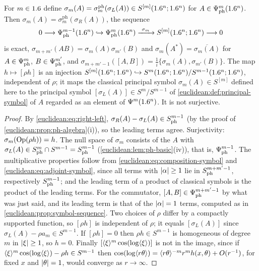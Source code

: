 \begin{proposition}\label{euclidean:prop:ph-symbol}
  For $m\in1.6$ define
  $\sigma_m(A)=\sigma^{\mathrm{ph}}_m(\sigma_L(A))\in S^{[m]}(1.6^n;1.6^n)$ for
  $A\in\Psi^{m}_{\mathrm{ph}}(1.6^n)$. Then $\sigma_m(A)=\sigma^{\mathrm{ph}}_m(\sigma_R(A))$,
  the sequence
  \begin{equation*}
    0\longrightarrow\Psido{m-1}_{\mathrm{ph}}(\R^n)\hookrightarrow
    \Psido m_{\mathrm{ph}}(\R^n)\xrightarrow{\ \sigma_m\ }S^{[m]}(\R^n;\R^n)
    \longrightarrow0
  \end{equation*}
  is exact, $\sigma_{m+m'}(AB)=\sigma_m(A)\sigma_{m'}(B)$ and
  $\sigma_m(A^*)=\overline{\sigma_m(A)}$ for $A\in\Psi^{m}_{\mathrm{ph}}$,
  $B\in\Psi^{m'}_{\mathrm{ph}}$, and $\sigma_{m+m'-1}([A,B])=\frac1i\{\sigma_m(A),\sigma_{m'}(B)\}$.
  The map $h\mapsto[\rho h]$ is an injection
  $S^{[m]}(1.6^n;1.6^n)\hookrightarrow S^m(1.6^n;1.6^n)/S^{m-1}(1.6^n;1.6^n)$, independent
  of $\rho$; it maps the classical principal symbol $\sigma_m(A)\in S^{[m]}$ defined here to
  the principal symbol $[\sigma_L(A)]\in S^m/S^{m-1}$ of
  \cref{euclidean:def:principal-symbol} of $A$ regarded as an element of
  $\Psi^{m}(1.6^n)$. It is not surjective.
\end{proposition}
\begin{proof}
  By \eqref{euclidean:eq:right-left}, $\sigma_R(A)-\sigma_L(A)\in S^{m-1}_{\mathrm{ph}}$ (by the
  proof of \cref{euclidean:prop:ph-algebra}(i)), so the leading terms agree.
  Surjectivity: $\sigma_m(\operatorname{Op}(\rho h))=h$. The null space of $\sigma_m$ consists of
  the $A$ with $\sigma_L(A)\in S^{m}_{\mathrm{ph}}\cap S^{m-1}=S^{m-1}_{\mathrm{ph}}$
  (\cref{euclidean:lem:ph-basic}(iv)), that is, $\Psi^{m-1}_{\mathrm{ph}}$. The
  multiplicative properties follow from \eqref{euclidean:eq:composition-symbol} and
  \eqref{euclidean:eq:adjoint-symbol}, since all terms with $\lvert \alpha\rvert\ge1$ lie in
  $S^{m+m'-1}_{\mathrm{ph}}$, respectively $S^{m-1}_{\mathrm{ph}}$; and the leading term of a product of
  classical symbols is the product of the leading terms. For the commutator,
  $[A,B]\in\Psi^{m+m'-1}_{\mathrm{ph}}$ by what was just said, and its leading
  term is that of the $\lvert \alpha\rvert=1$ terms, computed as in
  \cref{euclidean:prop:symbol-sequence}. Two choices of $\rho$ differ by a compactly
  supported function, so $[\rho h]$ is independent of $\rho$; it equals $[\sigma_L(A)]$
  since $\sigma_L(A)-\rho a_m\in S^{m-1}$. If $[\rho h]=0$ then $\rho h\in S^{m-1}$
  is homogeneous of degree $m$ in $\lvert \xi\rvert\ge1$, so $h=0$. Finally
  $[\langle \xi\rangle^m\cos(\log\langle \xi\rangle)]$ is not in the image, since if
  $\langle \xi\rangle^m\cos(\log\langle \xi\rangle)-\rho h\in S^{m-1}$ then
  $\cos(\log\langle r\theta\rangle)=\langle r\theta\rangle^{-m}r^mh(x,\theta)+O(r^{-1})$, for fixed $x$ and $\lvert \theta\rvert=1$, would converge as
  $r\to\infty$.
\end{proof}

